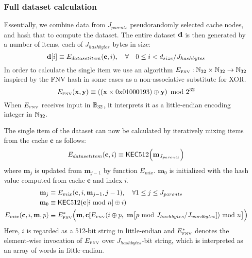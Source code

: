 \subsubsection{Full dataset calculation} \label{app:dataset}
Essentially, we combine data from $J_{parents}$ pseudorandomly selected cache nodes, and hash that to compute the dataset. The entire dataset $\mathbf{d}$ is then generated by a number of items, each of $J_{hashbytes}$ bytes in size:
\begin{equation}
\mathbf{d}[i] \equiv E_{datasetitem}(\mathbf{c}, i), \quad \forall \quad 0\le i < d_{size}/J_{hashbytes} 
\end{equation}
In order to calculate the single item we use an algorithm $E_\text{\tiny FNV}:\mathbb{N}_{32}\times\mathbb{N}_{32} \to \mathbb{N}_{32}$ inspired by the FNV hash \cite{FowlerNollVo1991FNVHash} in some cases as a non-associative substitute for XOR.
\begin{equation}
	E_\text{\tiny FNV}(\mathbf{x}, \mathbf{y}) \equiv \left( (\mathbf{x} \times \mathrm{0x01000193}) \oplus \mathbf{y}\right) \mbox{ mod } 2^{32}
\end{equation}
When $E_\text{\tiny FNV}$ receives input in $\mathbb{B}_{32}$, it interprets it as a little-endian encoding integer in $\mathbb{N}_{32}$.

The single item of the dataset can now be calculated by iteratively mixing items from the cache $\mathbf{c}$ as follows:
\begin{equation}
 E_{datasetitem}(\mathbf{c}, i) \equiv 
 \mathsf{KEC}512\Big(\mathbf{m}_{J_{parents}}\Big)
\end{equation}
where $\mathbf{m}_{j}$ is updated from $\mathbf{m}_{j-1}$ by function $E_{mix}$. $\mathbf{m}_0$ is initialized with the hash value computed from cache $\mathbf{c}$ and index $i$.
\begin{align}
	\mathbf{m}_j &\equiv E_{mix}(\mathbf{c}, i, \mathbf{m}_{j-1},j-1), \quad \forall 1\le j \le J_{parents} \\
	\mathbf{m}_0 &\equiv \mathsf{KEC}512(\mathbf{c}[i\mbox{ mod } n] \oplus i) \\
	E_{mix}(\mathbf{c}, i, \mathbf{m},p) & \equiv E_\text{\tiny FNV}^*\Big(\mathbf{m}, \mathbf{c}[E_\text{\tiny FNV}(i \oplus p, ~ \mathbf{m}\big[p \mbox{ mod } J_{hashbytes} / J_{wordbytes} ]) \mbox{ mod } n \big] \Big)
\end{align}
Here, $i$ is regarded as a 512-bit string in little-endian
and $E_\text{\tiny FNV}^*$ denotes the element-wise invocation of $E_\text{\tiny FNV}$ over $J_{hashbytes}$-bit string, which is interpreted as an array of words in little-endian. 

